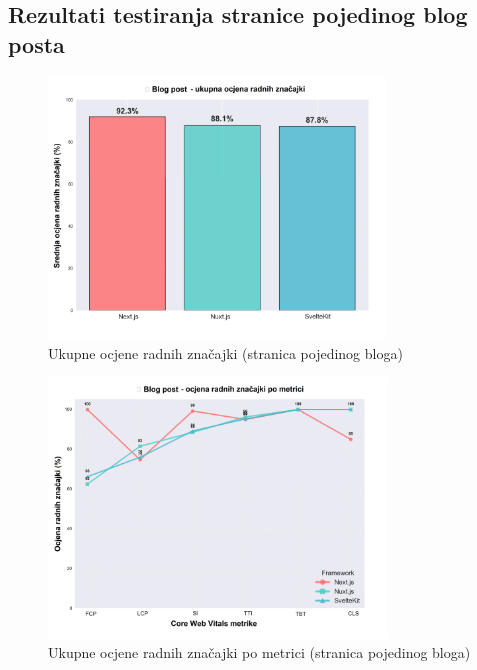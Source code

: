 
\subsection{Rezultati testiranja stranice pojedinog blog posta}
\label{sec:rezultati-blog-post}

\begin{figure}[H]
    \centering
    \includegraphics[width=0.8\textwidth]{slike/rezultati/blog-post/blogPost_framework_overall_performance.png}
    \caption{Ukupne ocjene radnih značajki (stranica pojedinog bloga) }
    \label{fig:testiranje-blog-post-ukupne-performanse}
\end{figure}

\begin{figure}[H]
    \centering
    \includegraphics[width=0.8\textwidth]{slike/rezultati/blog-post/blogPost_performance_by_metric.png}
    \caption{Ukupne ocjene radnih značajki po metrici (stranica pojedinog bloga) }
    \label{fig:testiranje-blog-post-performanse-po-metrici}
\end{figure}

